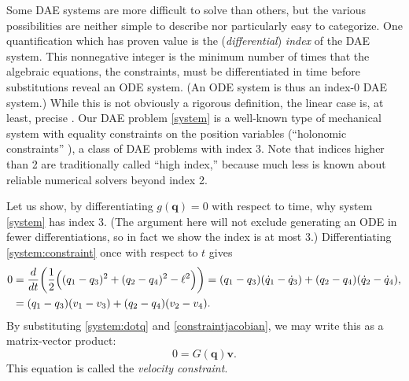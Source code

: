 \documentclass[letterpaper,final,12pt,reqno]{amsart}
\newcommand{\bq}{\mathbf{q}}
\newcommand{\bv}{\mathbf{v}}
\begin{document}
Some DAE systems are more difficult to solve than others, but the various possibilities are neither simple to describe nor particularly easy to categorize.  One quantification which has proven value is the (\emph{differential}) \emph{index} of the DAE system.  This nonnegative integer is the minimum number of times that the algebraic equations, the constraints, must be differentiated in time before substitutions reveal an ODE system.  (An ODE system is thus an index-0 DAE system.)  While this is not obviously a rigorous definition, the linear case is, at least, precise \cite[Chapter IV.5]{HairerWanner1996}.  Our DAE problem \eqref{system} is a well-known type of mechanical system with equality constraints on the position variables (``holonomic constraints'' \cite{Lanczos1970}), a class of DAE problems with index 3.  Note that indices higher than 2 are traditionally called ``high index,'' because much less is known about reliable numerical solvers beyond index 2.

Let us show, by differentiating $g(\bq)=0$ with respect to time, why system \eqref{system} has index 3.  (The argument here will not exclude generating an ODE in fewer differentiations, so in fact we show the index is at most 3.)  Differentiating \eqref{system:constraint} once with respect to $t$ gives
\begin{align}
0 &= \frac{d}{dt} \bigg(\frac{1}{2} \Big((q_1 - q_3)^2 + (q_2 - q_4)^2 - \ell^2\Big)\bigg) = (q_1 - q_3)(\dot q_1 - \dot q_3) + (q_2 - q_4) (\dot q_2 - \dot q_4), \notag \\
  &= (q_1 - q_3)(v_1 - v_3) + (q_2 - q_4) (v_2 - v_4). \label{rawvelocityconstraint}
\end{align}
By substituting \eqref{system:dotq} and \eqref{constraintjacobian}, we may write this as a matrix-vector product:
\begin{equation}
0 = G(\bq) \bv. \label{velocityconstraint}
\end{equation}
This equation is called the \emph{velocity constraint}.
\end{document}
